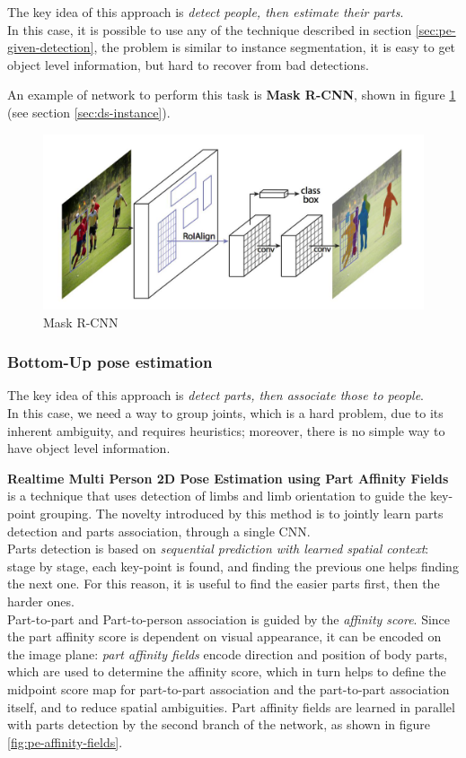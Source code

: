 The key idea of this approach is \textit{detect people, then estimate their parts}.\\
In this case, it is possible to use any of the technique described in section \ref{sec:pe-given-detection}, the problem is similar to instance segmentation, it is easy to get object level information, but hard to recover from bad detections.

An example of network to perform this task is \textbf{Mask R-CNN}, shown in figure \ref{fig:pe-mask-r-cnn} (see section \ref{sec:ds-instance}).

\begin{figure}[h!]
    \centering
    \includegraphics[width=0.7\linewidth]{images/mask-r-cnn}
    \caption[Mask R-CNN]{Mask R-CNN}
    \label{fig:pe-mask-r-cnn}
\end{figure}


\subsubsection{Bottom-Up pose estimation}\label{sec:pe-bottom-up}

The key idea of this approach is \textit{detect parts, then associate those to people}.\\
In this case, we need a way to group joints, which is a hard problem, due to its inherent ambiguity, and requires heuristics; moreover, there is no simple way to have object level information.

\textbf{Realtime Multi Person 2D Pose Estimation using Part Affinity Fields} is a technique that uses detection of limbs and limb orientation to guide the key-point grouping. The novelty introduced by this method is to jointly learn parts detection and parts association, through a single CNN.\\
Parts detection is based on \textit{sequential prediction with learned spatial context}: stage by stage, each key-point is found, and finding the previous one helps finding the next one. For this reason, it is useful to find the easier parts first, then the harder ones.\\
Part-to-part and Part-to-person association is guided by the \textit{affinity score}. Since the part affinity score is dependent on visual appearance, it can be encoded on the image plane: \textit{part affinity fields} encode direction and position of body parts, which are used to determine the affinity score, which in turn helps to define the midpoint score map for part-to-part association and the part-to-part association itself, and to reduce spatial ambiguities. Part affinity fields are learned in parallel with parts detection by the second branch of the network, as shown in figure \ref{fig:pe-affinity-fields}.

